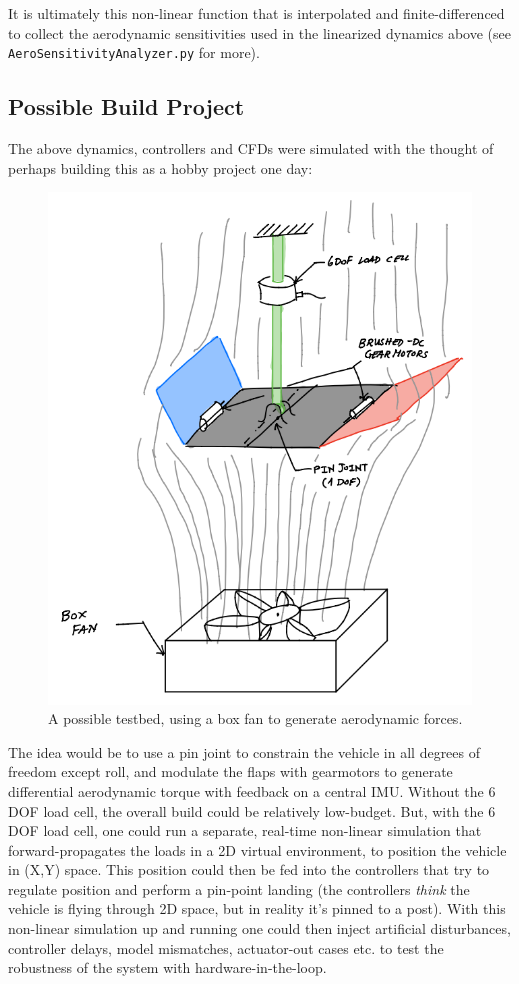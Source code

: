 \documentclass[12pt]{article}
\begin{document}
It is ultimately this non-linear function that is interpolated and finite-differenced to collect the aerodynamic sensitivities used in the linearized dynamics above (see \texttt{AeroSensitivityAnalyzer.py} for more).


\bigskip\bigskip\bigskip\bigskip
\subsection*{Possible Build Project}

The above dynamics, controllers and CFDs were simulated with the thought of perhaps building this as a hobby project one day:

\begin{figure}[h!]
\centering
\includegraphics[width=.6\linewidth]{../misc/testbed_figure.png}
\caption{A possible testbed, using a box fan to generate aerodynamic forces.}
\end{figure}

The idea would be to use a pin joint to constrain the vehicle in all degrees of freedom except roll, and modulate the flaps with gearmotors to generate differential aerodynamic torque with feedback on a central IMU.  Without the 6 DOF load cell, the overall build could be relatively low-budget.  But, with the 6 DOF load cell, one could run a separate, real-time non-linear simulation that forward-propagates the loads in a 2D virtual environment, to position the vehicle in (X,Y) space.  This position could then be fed into the controllers that try to regulate position and perform a pin-point landing (the controllers \textit{think} the vehicle is flying through 2D space, but in reality it's pinned to a post).  With this non-linear simulation up and running one could then inject artificial disturbances, controller delays, model mismatches, actuator-out cases etc. to test the robustness of the system with hardware-in-the-loop.
\end{document}
